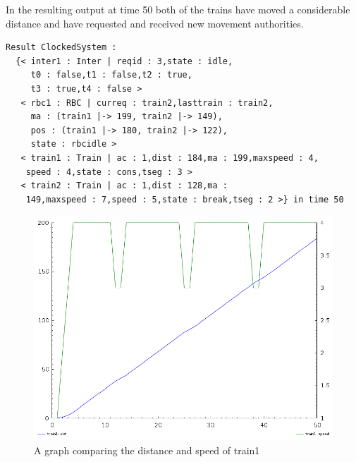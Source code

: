 In the resulting output at time 50 both of the trains have moved a considerable distance and have requested and received new movement authorities.
 
\begin{lstlisting}[caption = The result of rewriting initialstate2 for 50 time steps]
Result ClockedSystem :
  {< inter1 : Inter | reqid : 3,state : idle,
     t0 : false,t1 : false,t2 : true,
     t3 : true,t4 : false > 
   < rbc1 : RBC | curreq : train2,lasttrain : train2,
     ma : (train1 |-> 199, train2 |-> 149),
     pos : (train1 |-> 180, train2 |-> 122),
     state : rbcidle > 
   < train1 : Train | ac : 1,dist : 184,ma : 199,maxspeed : 4,
    speed : 4,state : cons,tseg : 3 > 
   < train2 : Train | ac : 1,dist : 128,ma :
    149,maxspeed : 7,speed : 5,state : break,tseg : 2 >} in time 50
\end{lstlisting}

\begin{figure}
\begin{center}
\includegraphics[scale=0.4]{t1graph.png}
\end{center}
\caption{A graph comparing the distance and speed of train1}
\end{figure}


